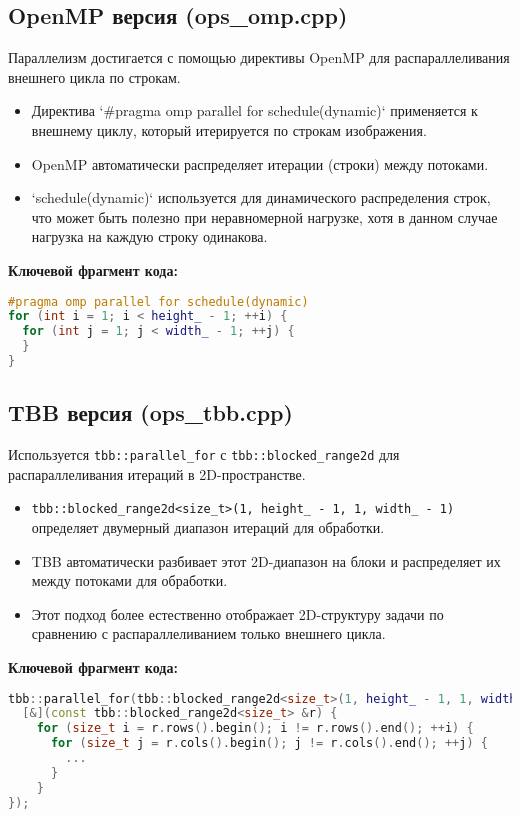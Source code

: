 \documentclass[12pt,a4paper]{extarticle}
\begin{document}
\subsection{OpenMP версия (ops\_omp.cpp)}
Параллелизм достигается с помощью директивы OpenMP для распараллеливания внешнего цикла по строкам.
\begin{itemize}
    \item Директива `\#pragma omp parallel for schedule(dynamic)` применяется к внешнему циклу, который итерируется по строкам изображения.
    \item OpenMP автоматически распределяет итерации (строки) между потоками.
    \item `schedule(dynamic)` используется для динамического распределения строк, что может быть полезно при неравномерной нагрузке, хотя в данном случае нагрузка на каждую строку одинакова.
\end{itemize}

\textbf{Ключевой фрагмент кода:}
\begin{lstlisting}[language=C++]
#pragma omp parallel for schedule(dynamic)
for (int i = 1; i < height_ - 1; ++i) {
  for (int j = 1; j < width_ - 1; ++j) {
  }
}
\end{lstlisting}

\subsection{TBB версия (ops\_tbb.cpp)}
Используется \lstinline{tbb::parallel_for} с \lstinline{tbb::blocked_range2d} для распараллеливания итераций в 2D-пространстве.
\begin{itemize}
    \item \lstinline{tbb::blocked_range2d<size_t>(1, height_ - 1, 1, width_ - 1)} определяет двумерный диапазон итераций для обработки.
    \item TBB автоматически разбивает этот 2D-диапазон на блоки и распределяет их между потоками для обработки.
    \item Этот подход более естественно отображает 2D-структуру задачи по сравнению с распараллеливанием только внешнего цикла.
\end{itemize}

\textbf{Ключевой фрагмент кода:}
\begin{lstlisting}[language=C++]
tbb::parallel_for(tbb::blocked_range2d<size_t>(1, height_ - 1, 1, width_ - 1),
  [&](const tbb::blocked_range2d<size_t> &r) {
    for (size_t i = r.rows().begin(); i != r.rows().end(); ++i) {
      for (size_t j = r.cols().begin(); j != r.cols().end(); ++j) {
        ... 
      }
    }
});
\end{lstlisting}
\end{document}
